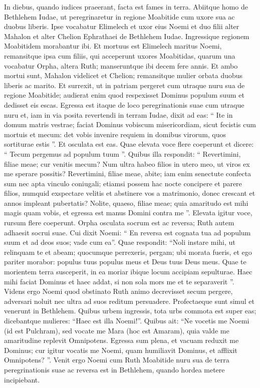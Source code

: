 \begin{biblechapter}
 \verse In diebus, quando iudices praeerant, facta est fames in terra. Abiitque homo de Bethlehem Iudae, ut peregrinaretur in regione Moabitide cum uxore sua ac duobus liberis. 
\verse Ipse vocabatur Elimelech et uxor eius Noemi et duo filii alter Mahalon et alter Chelion Ephrathaei de Bethlehem Iudae. Ingressique regionem Moabitidem morabantur ibi. 
 \verse Et mortuus est Elimelech maritus Noemi, remansitque ipsa cum filiis, 
\verse qui acceperunt uxores Moabitidas, quarum una vocabatur Orpha, altera Ruth; manseruntque ibi decem fere annis. 
\verse Et ambo mortui sunt, Mahalon videlicet et Chelion; remansitque mulier orbata duobus liberis ac marito.
 \verse Et surrexit, ut in patriam pergeret cum utraque nuru sua de regione Moabitide; audierat enim quod respexisset Dominus populum suum et dedisset eis escas. 
\verse Egressa est itaque de loco peregrinationis suae cum utraque nuru et, iam in via posita revertendi in terram Iudae, 
\verse dixit ad eas: “ Ite in domum matris vestrae; faciat Dominus vobiscum misericordiam, sicut fecistis cum mortuis et mecum: 
\verse det vobis invenire requiem in domibus virorum, quos sortiturae estis ”. Et osculata est eas. Quae elevata voce flere coeperunt 
\verse et dicere: “ Tecum pergemus ad populum tuum ”. 
\verse Quibus illa respondit: “ Revertimini, filiae meae; cur venitis mecum? Num ultra habeo filios in utero meo, ut viros ex me sperare possitis? 
\verse Revertimini, filiae meae, abite; iam enim senectute confecta sum nec apta vinculo coniugali; etiamsi possem hac nocte concipere et parere filios, 
\verse numquid exspectare velitis et abstinere vos a matrimonio, donec crescant et annos impleant pubertatis? Nolite, quaeso, filiae meae; quia amaritudo est mihi magis quam vobis, et egressa est manus Domini contra me ”. 
\verse Elevata igitur voce, rursum flere coeperunt. Orpha osculata socrum est ac reversa; Ruth autem adhaesit socrui suae.
 \verse Cui dixit Noemi: “ En reversa est cognata tua ad populum suum et ad deos suos; vade cum ea”. 
\verse Quae respondit: “Noli instare mihi, ut relinquam te et abeam; quocumque perrexeris, pergam; ubi morata fueris, et ego pariter morabor: populus tuus populus meus et Deus tuus Deus meus. 
\verse Quae te morientem terra susceperit, in ea moriar ibique locum accipiam sepulturae. Haec mihi faciat Dominus et haec addat, si non sola mors me et te separaverit ”. 
 \verse Videns ergo Noemi quod obstinato Ruth animo decrevisset secum pergere, adversari noluit nec ultra ad suos reditum persuadere.
 \verse Profectaeque sunt simul et venerunt in Bethlehem. Quibus urbem ingressis, tota urbs commota est super eas; dicebantque mulieres: “Haec est illa Noemi!”. 
\verse Quibus ait: “Ne vocetis me Noemi (id est Pulchram), sed vocate me Mara (hoc est Amaram), quia valde me amaritudine replevit Omnipotens. 
\verse Egressa sum plena, et vacuam reduxit me Dominus; cur igitur vocatis me Noemi, quam humiliavit Dominus, et afflixit Omnipotens? ”.
 \verse Venit ergo Noemi cum Ruth Moabitide nuru sua de terra peregrinationis suae ac reversa est in Bethlehem, quando hordea metere incipiebant.
 

\end{biblechapter}
